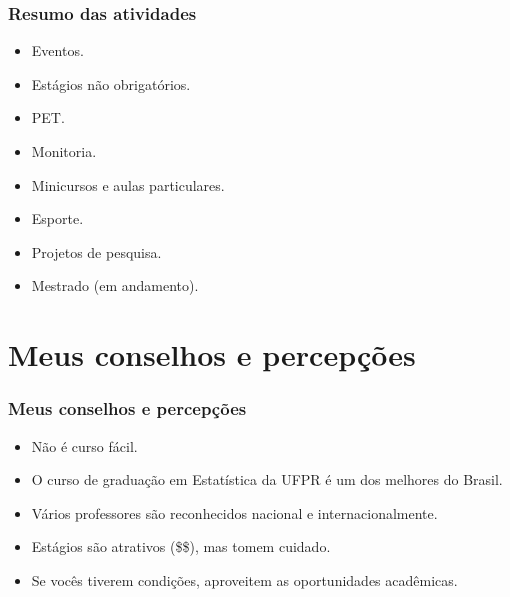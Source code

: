 \documentclass[10pt,
  aspectratio=169,
  serif,
  mathserif,
  professionalfont,
  compress,
  handout,
  ]{beamer}\usepackage[]{graphicx}\usepackage[]{color}
\begin{document}
\begin{frame}

\frametitle{Resumo das atividades}

  \begin{itemize}
  
    \itemsep 1ex
  
  \item Eventos. 
  
  \item Estágios não obrigatórios.
  
  \item PET.
  
  \item Monitoria.
  
  \item Minicursos e aulas particulares.
  
  \item Esporte.
  
  \item Projetos de pesquisa.
  
  \item Mestrado (em andamento).

  \end{itemize}
\end{frame}


\section{Meus conselhos e percepções}

\begin{frame}

\frametitle{Meus conselhos e percepções}

  \begin{itemize}
  
    \itemsep 2ex
  
  \item Não é curso fácil.

  \item O curso de graduação em Estatística da UFPR é um dos melhores do Brasil.

  \item Vários professores são reconhecidos nacional e internacionalmente.

  \item Estágios são atrativos (\$\$), mas tomem cuidado.

  \item Se vocês tiverem condições, aproveitem as oportunidades acadêmicas. 
  

  \end{itemize}
\end{frame}
\end{document}
